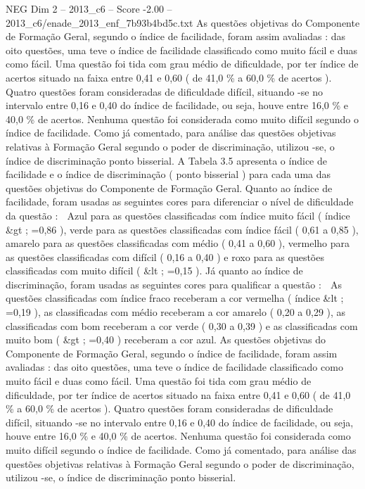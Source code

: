 \begin{textsample}{NEG Dim 2 – 2013\_c6 – Score -2.00 – 2013\_c6/enade\_2013\_enf\_7b93b4bd5c.txt}
As questões objetivas do Componente de Formação Geral, segundo o índice de facilidade, foram assim avaliadas : das oito questões, uma teve o índice de facilidade classificado como muito fácil e duas como fácil.
Uma questão foi tida com grau médio de dificuldade, por ter índice de acertos situado na faixa entre 0,41 e 0,60 ( de 41,0 \% a 60,0 \% de acertos ).
Quatro questões foram consideradas de dificuldade difícil, situando -se no intervalo entre 0,16 e 0,40 do índice de facilidade, ou seja, houve entre 16,0 \% e 40,0 \% de acertos.
Nenhuma questão foi considerada como muito difícil segundo o índice de facilidade.
Como já comentado, para análise das questões objetivas relativas à Formação Geral segundo o poder de discriminação, utilizou -se, o índice de discriminação ponto bisserial.
A Tabela 3.5 apresenta o índice de facilidade e o índice de discriminação ( ponto bisserial ) para cada uma das questões objetivas do Componente de Formação Geral.
Quanto ao índice de facilidade, foram usadas as seguintes cores para diferenciar o nível de dificuldade da questão :  Azul para as questões classificadas com índice muito fácil ( índice \&gt ; =0,86 ), verde para as questões classificadas com índice fácil ( 0,61 a 0,85 ), amarelo para as questões classificadas com médio ( 0,41 a 0,60 ), vermelho para as questões classificadas com difícil ( 0,16 a 0,40 ) e roxo para as questões classificadas com muito difícil ( \&lt ; =0,15 ).
Já quanto ao índice de discriminação, foram usadas as seguintes cores para qualificar a questão :  As questões classificadas com índice fraco receberam a cor vermelha ( índice \&lt ; =0,19 ), as classificadas com médio receberam a cor amarelo ( 0,20 a 0,29 ), as classificadas com bom receberam a cor verde ( 0,30 a 0,39 ) e as classificadas com muito bom ( \&gt ; =0,40 ) receberam a cor azul.
As questões objetivas do Componente de Formação Geral, segundo o índice de facilidade, foram assim avaliadas : das oito questões, uma teve o índice de facilidade classificado como muito fácil e duas como fácil.
Uma questão foi tida com grau médio de dificuldade, por ter índice de acertos situado na faixa entre 0,41 e 0,60 ( de 41,0 \% a 60,0 \% de acertos ).
Quatro questões foram consideradas de dificuldade difícil, situando -se no intervalo entre 0,16 e 0,40 do índice de facilidade, ou seja, houve entre 16,0 \% e 40,0 \% de acertos.
Nenhuma questão foi considerada como muito difícil segundo o índice de facilidade.
Como já comentado, para análise das questões objetivas relativas à Formação Geral segundo o poder de discriminação, utilizou -se, o índice de discriminação ponto bisserial.

\end{textsample}
